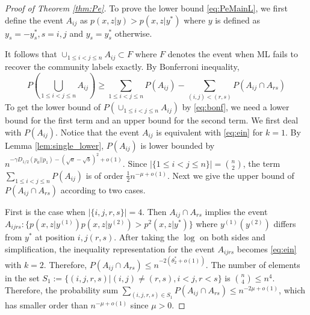 \documentclass[conference,letterpaper]{IEEEtran}
\begin{document}
\begin{proof}[Proof of Theorem \ref{thm:Pe}]
To prove the lower bound \eqref{eq:PeMainL},
we first define the event $A_{ij}$ as
$p(x,z|y) > p(x,z|y^*)$ where $y$ is defined as
$y_s=-y^*_s, s=i,j$ and $y_s=y^*_s$ otherwise.

It follows that $\cup_{1\leq i < j\leq n} A_{ij} \subset F$ where $F$ denotes the event when ML fails to recover the community labels exactly.
By Bonferroni inequality,
\begin{equation}\label{eq:bonf}
	P(\bigcup_{1\leq i < j\leq n} A_{ij}) \geq
	\sum_{1\leq i < j\leq n} P(A_{ij})
	- \sum_{(i,j) < (r,s) } P(A_{ij} \cap A_{rs})		
\end{equation}
To get the lower bound of $P(\cup_{1\leq i < j\leq n} A_{ij})$ by
\eqref{eq:bonf},
we need a lower bound for the first term and an upper bound for
the second term.
We first deal with $P(A_{ij})$.
Notice that the event $A_{ij}$
is equivalent with \eqref{eq:ein} for $k=1$.
By Lemma \ref{lem:single_lower}, $P(A_{ij})$ is lower bounded by $n^{-\gamma D_{1/2}(p_0 || p_1)-(\sqrt{a} - \sqrt{b})^2 +o(1)}$. Since $|\{1\leq i < j\leq n\}|=\binom{n}{2}$, the term $\sum_{1\leq i < j\leq n} P(A_{ij})$ is of order $\frac{1}{2}n^{-\mu+o(1)}$.
Next we give the upper bound of $P(A_{ij} \cap A_{rs})$ according to two cases.

First is the case when $|\{i,j,r,s\}|=4$. Then $A_{ij} \cap A_{rs}$ implies the event
$A_{ijrs}: \{p(x,z|y^{(1)})p(x,z|y^{(2)}) > p^2(x,z|y^*)\}$ where $y^{(1)}(y^{(2)})$ differs from $y^*$ at position $i,j(r,s)$.
After taking the $\log$ on both sides and simplification,
the inequality representation for the event $A_{ijrs}$ becomes \eqref{eq:ein}  with $k=2$.
Therefore, $P(A_{ij} \cap A_{rs}) \leq n^{-2(\theta^*_2 + o(1))} $. The number of elements
in the set $S_1:=\{(i,j,r,s)| (i,j)\neq (r,s), i<j, r<s\}$ is $\binom{n}{4} \leq n^4$.
Therefore, the probability sum
$\sum_{(i,j,r,s) \in S_1} P(A_{ij} \cap A_{rs})
\leq n^{-2\mu +o(1)}$,
which has smaller order than $n^{-\mu+o(1)}$ since $\mu > 0$.


\end{proof}
\end{document}
